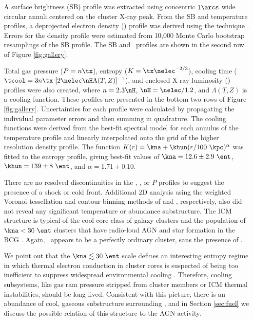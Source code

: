 \documentclass[useAMS,usenatbib]{mn2e}
\begin{document}
A surface brightness (SB) profile was extracted using concentric
$1\arcs$ wide circular annuli centered on the cluster X-ray peak. From
the SB and temperature profiles, a deprojected electron density
(\nelec) profile was derived using the \citet{kriss83} technique
\citep[see][for more detail]{accept}. Errors for the density profile
were estimated from 10,000 Monte Carlo bootstrap resamplings of the SB
profile. The SB and \nelec\ profiles are shown in the second row of
Figure \ref{fig:gallery}.

Total gas pressure ($P = n \tx$), entropy ($K = \tx\nelec^{-2/3}$),
cooling time ($\tcool = 3n\tx~[2\nelec \nH \Lambda(T,Z)]^{-1}$), and
enclosed X-ray luminosity (\lx) profiles were also created, where $n =
2.3 \nH$, $\nH = \nelec/1.2$, and $\Lambda(T,Z)$ is a cooling
function. These profiles are presented in the bottom two rows of
Figure \ref{fig:gallery}. Uncertainties for each profile were
calculated by propagating the individual parameter errors and then
summing in quadrature. The cooling functions were derived from the
best-fit spectral model for each annulus of the temperature profile
and linearly interpolated onto the grid of the higher resolution
density profile. The function $K(r) = \kna +\khun (r/100
~\kpc)^{\alpha}$ was fitted to the entropy profile, giving best-fit
values of $\kna = 12.6 \pm 2.9 ~\ent$, $\khun = 139 \pm 8 ~\ent$, and
$\alpha = 1.71 \pm 0.10$.

There are no resolved discontinuities in the \tx, \nelec, or $P$
profiles to suggest the presence of a shock or cold front. Additional
2D analysis using the weighted Voronoi tessellation and contour
binning methods of \citet{wvt} and \citet{2006MNRAS.371..829S},
respectively, also did not reveal any significant temperature or
abundance substructure. The ICM structure is typical of the cool core
class of galaxy clusters \citep[\eg][]{accept, 2009MNRAS.395..764S}
and the population of $\kna < 30 ~\ent$ clusters that have radio-loud
AGN and star formation in the BCG \citep{haradent, rafferty08}. Again,
\rxj\ appears to be a perfectly ordinary cluster, sans the presence of
\irs.

We point out that the $\kna \la 30 ~\ent$ scale defines an interesting
entropy regime in which thermal electron conduction in cluster cores
is suspected of being too inefficient to suppress widespread
environmental cooling \citep{conduction}. Therefore, cooling
subsystems, like gas ram pressure stripped from cluster members or ICM
thermal instabilities, should be long-lived. Consistent with this
picture, there is an abundance of cool, gaseous substructure
surrounding \irs, and in Section \ref{sec:fuel} we discuss the
possible relation of this structure to the AGN activity.
\end{document}
